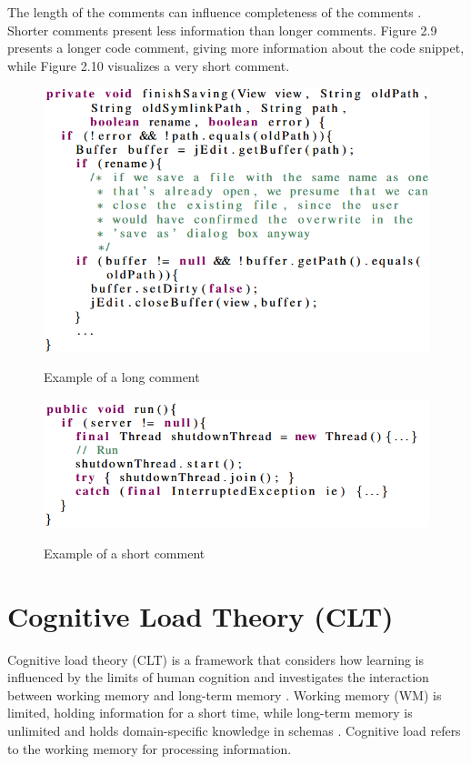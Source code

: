 The length of the comments can influence completeness of the comments \cite{steidl2013quality}. Shorter comments present less information than longer comments. Figure 2.9 presents a longer code comment, giving more information about the code snippet, while Figure 2.10 visualizes a very short comment.

\begin{figure} [H]
  \centering
  \includegraphics [scale=1]
  {figures/long.png}
  \caption{Example of a long comment}
  \cite{steidl2013quality}
  \label{fig:AnhangsChor}
\end{figure}

\begin{figure} [H]
  \centering
  \includegraphics [scale=0.9]
  {figures/run1.png}
  \caption{Example of a short comment}
  \cite{steidl2013quality}
  \label{fig:AnhangsChor}
\end{figure}





\section{Cognitive Load Theory (CLT)}
Cognitive load theory (CLT) is a framework that considers how learning is influenced by the limits of human cognition and investigates the interaction between working memory and long-term memory \cite{duran2022cognitive}. Working memory (WM) is limited, holding information for a short time, while long-term memory is unlimited and holds domain-specific knowledge in schemas  \cite{zavgorodniaia2020measuring}.
Cognitive load refers to the working memory for processing information. 

